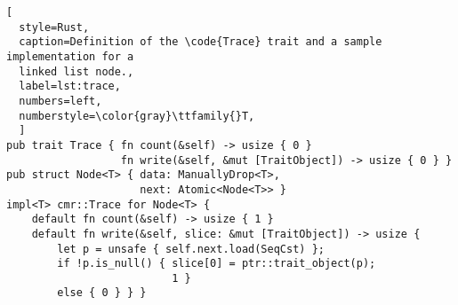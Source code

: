 \begin{lstlisting}[
  style=Rust,
  caption=Definition of the \code{Trace} trait and a sample implementation for a
  linked list node.,
  label=lst:trace,
  numbers=left,
  numberstyle=\color{gray}\ttfamily{}T,
  ]
pub trait Trace { fn count(&self) -> usize { 0 }
                  fn write(&self, &mut [TraitObject]) -> usize { 0 } }
pub struct Node<T> { data: ManuallyDrop<T>,
                     next: Atomic<Node<T>> }
impl<T> cmr::Trace for Node<T> {
    default fn count(&self) -> usize { 1 }
    default fn write(&self, slice: &mut [TraitObject]) -> usize {
        let p = unsafe { self.next.load(SeqCst) };
        if !p.is_null() { slice[0] = ptr::trait_object(p);
                          1 } 
        else { 0 } } }\end{lstlisting}
